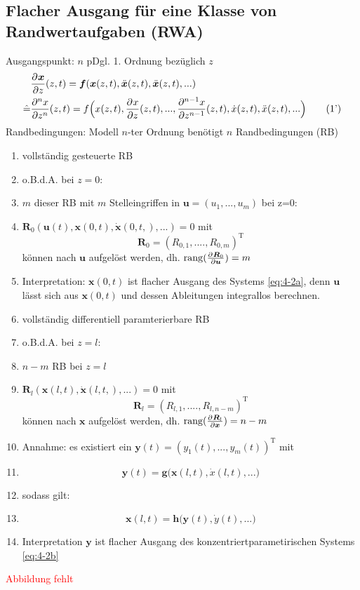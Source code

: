 \subsection{Flacher Ausgang für eine Klasse von Randwertaufgaben (RWA)}
\setcounter{equation}{0}
Ausgangspunkt: $n$ pDgl. 1. Ordnung bezüglich $z$
\begin{align}
&\pd{\bm{x}}{z}(z,t) = \bm{f}(\bm{x}(z,t),\ddot{\bm{x}}(z,t),\ddot{\bm{x}}(z,t),...) \\
\hat{=}&\pd[n]{x}{z^n}(z,t)=f\Big(x(z,t),\pd{x}{z}(z,t),...,\pd[n-1]{x}{z^{n-1}}(z,t),\dot{x}(z,t),\ddot{x}(z,t),...\Big) \tag{1'}
\end{align}
Randbedingungen:
Modell $n$-ter Ordnung benötigt $n$ Randbedingungen (RB) 
\begin{enumerate}
\item vollständig gesteuerte RB 
\item[] o.B.d.A. bei $z=0$: 
\item[] $m$ dieser RB mit $m$ Stelleingriffen in $\bm{u}=(u_1,...,u_m)$ bei z=0:
\item[] $\bm{R}_0(\bm{u}(t),\bm{x}(0,t),\dot{\bm{x}}(0,t,),...)=0$ mit
 \[\bm{R}_0 = (R_{0,1},....,R_{0,m})^\textrm{T} \tag{2a} \label{eq:4-2a}\]können nach $\bm{u}$ aufgelöst werden, dh. $\rang(\pd{\bm{R}_0}{\bm{u}})=m$
\item[]Interpretation: $\bm{x}(0,t)$ ist flacher Ausgang des Systems \eqref{eq:4-2a}, denn $\bm{u}$ lässt sich aus $\bm{x}(0,t)$ und dessen Ableitungen integrallos berechnen.
\item vollständig differentiell paramterierbare RB 
\item[] o.B.d.A. bei $z=l$:
\item[] $n-m$ RB bei $z = l$ 
\item[] $\bm{R}_l(\bm{x}(l,t),\dot{\bm{x}}(l,t,),...)=0$ mit
 \[\bm{R}_l = (R_{l,1},....,R_{l,n-m})^\textrm{T} \tag{2b} \label{eq:4-2b}\] können nach $\bm{x}$ aufgelöst werden, dh. $\rang(\pd{\bm{R}_l}{\bm{x}})=n-m$
 \item[] Annahme: es existiert ein $\bm{y}(t)=(y_1(t),...,y_{m}(t))^\textrm{T}$ mit 
 \item[] \[\bm{y}(t) = \bm{g}\Big( \bm{x}(l,t),\dot{x}(l,t),...\Big) \tag{3} \label{eq:4-3}\]
 \item[] sodass gilt:
 \item[] \[\bm{x}(l,t) = \bm{h}\Big( \bm{y}(t),\dot{y}(t),...\Big)\tag{4} \label{eq:4-4}\]
 \item[] Interpretation $\bm{y}$ ist flacher Ausgang des konzentriertparametirischen Systems \eqref{eq:4-2b}
\end{enumerate}
\textcolor{red}{Abbildung fehlt}